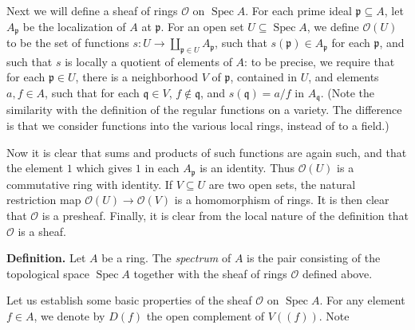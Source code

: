 {Next we will define a sheaf of rings $\mathcal O$ on $\operatorname{Spec}A$. For each prime ideal $\mathfrak p\subseteq A$, let $A_{\mathfrak p}$ be the localization of $A$ at $\mathfrak p$. For an open set $U\subseteq\operatorname{Spec}A$, we define $\mathcal O(U)$ to be the set of functions $s\colon U\to\coprod_{\mathfrak p\in U}A_{\mathfrak p}$, such that $s(\mathfrak p)\in A_{\mathfrak p}$ for each $\mathfrak p$, and such that $s$ is locally a quotient of elements of $A$: to be precise, we require that for each $\mathfrak p\in U$, there is a neighborhood $V$ of $\mathfrak p$, contained in $U$, and elements $a,f\in A$, such that for each $\mathfrak q\in V$, $f\notin\mathfrak q$, and $s(\mathfrak q)=a/f$ in $A_{\mathfrak q}$. (Note the similarity with the definition of the regular functions on a variety. The difference is that we consider functions into the various local rings, instead of to a field.)

Now it is clear that sums and products of such functions are again such, and that the element $1$ which gives $1$ in each $A_{\mathfrak p}$ is an identity. Thus $\mathcal O(U)$ is a commutative ring with identity. If $V\subseteq U$ are two open sets, the natural restriction map $\mathcal O(U)\to\mathcal O(V)$ is a homomorphism of rings. It is then clear that $\mathcal O$ is a presheaf. Finally, it is clear from the local nature of the definition that $\mathcal O$ is a sheaf.

\smallskip
\noindent\textbf{Definition.} Let $A$ be a ring. The \emph{spectrum} of $A$ is the pair consisting of the topological space $\operatorname{Spec}A$ together with the sheaf of rings $\mathcal O$ defined above.

\smallskip
Let us establish some basic properties of the sheaf $\mathcal O$ on $\operatorname{Spec}A$. For any element $f\in A$, we denote by $D(f)$ the open complement of $V((f))$. Note
}
